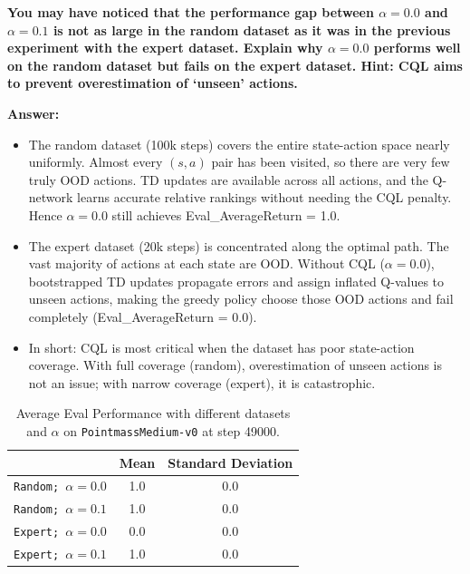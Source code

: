 \documentclass{article}
\begin{document}
\textbf{You may have noticed that the performance gap between $\alpha = 0.0$ and $\alpha = 0.1$ is not as large in the random dataset as it was in the previous experiment with the expert dataset. Explain why $\alpha=0.0$ performs well on the random dataset but fails on the expert dataset. Hint: CQL aims to prevent overestimation of `unseen' actions.}
 
\textbf{Answer:}
\begin{itemize}
    \item The random dataset (100k steps) covers the entire state-action space nearly uniformly. Almost every $(s, a)$ pair has been visited, so there are very few truly OOD actions. TD updates are available across all actions, and the Q-network learns accurate relative rankings without needing the CQL penalty. Hence $\alpha=0.0$ still achieves Eval\_AverageReturn = 1.0.
    \item The expert dataset (20k steps) is concentrated along the optimal path. The vast majority of actions at each state are OOD. Without CQL ($\alpha=0.0$), bootstrapped TD updates propagate errors and assign inflated Q-values to unseen actions, making the greedy policy choose those OOD actions and fail completely (Eval\_AverageReturn = 0.0).
    \item In short: CQL is most critical when the dataset has poor state-action coverage. With full coverage (random), overestimation of unseen actions is not an issue; with narrow coverage (expert), it is catastrophic.
\end{itemize}

\begin{table}[H]
    \centering
    \caption{Average Eval Performance with different datasets and $\alpha$ on \texttt{PointmassMedium-v0} at step 49000.}
    \label{tab:pointmass_CQL_random_results}
    \begin{tabular}{c|cc}
        \toprule
        & Mean & Standard Deviation \\
        \midrule
        \texttt{Random; $\alpha = 0.0$} & 1.0 & 0.0 \\
        \texttt{Random; $\alpha = 0.1$} & 1.0 & 0.0 \\
        \midrule
        \texttt{Expert; $\alpha = 0.0$} & 0.0 & 0.0 \\
        \texttt{Expert; $\alpha = 0.1$} & 1.0 & 0.0 \\
        \bottomrule
    \end{tabular}
\end{table}
\end{document}
